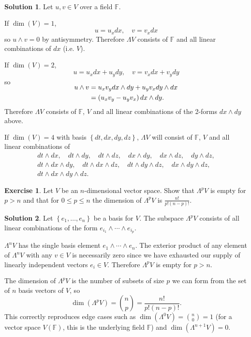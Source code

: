 \documentclass[11pt, a4paper]{article}
\theoremstyle{definition}
\newtheorem{ex}{Exercise}[part]
\newtheorem{sol}{Solution}[part]
\begin{document}
\begin{sol}

Let $u, v \in V$ over a field $\mathbb{F}$.

If $\dim(V) = 1$,
\[
    u = u_x dx, \quad v = v_x dx
\]
so $u \wedge v = 0$ by antisymmetry. Therefore $\Lambda V$ consists of $\mathbb{F}$ and all linear combinations of $dx$ (i.e. $V$).

If $\dim(V) = 2$,
\[
    u = u_x dx + u_y dy, \quad v = v_x dx + v_y dy
\]
so
\begin{align*}
    \SwapAboveDisplaySkip
    u \wedge v &= u_x v_y dx \wedge dy + u_y v_x dy \wedge dx \\
               &= (u_x v_y - u_y v_x) \, dx \wedge dy.
\end{align*}
Therefore $\Lambda V$ consists of $\mathbb{F}$, $V$ and all linear combinations of the 2-forms $dx \wedge dy$ above.

If $\dim(V) = 4$ with basis $\left\{dt, dx, dy, dz\right\}$, $\Lambda V$ will consist of $\mathbb{F}$, $V$ and all linear combinations of
\begin{gather*}
    dt \wedge dx, \quad
    dt \wedge dy, \quad
    dt \wedge dz, \quad
    dx \wedge dy, \quad
    dx \wedge dz, \quad
    dy \wedge dz, \\
    dt \wedge dx \wedge dy, \quad
    dt \wedge dx \wedge dz, \quad
    dt \wedge dy \wedge dz, \quad
    dx \wedge dy \wedge dz, \\
    dt \wedge dx \wedge dy \wedge dz.
\end{gather*}

\end{sol}

\begin{ex}

Let $V$ be an $n$-dimensional vector space. Show that $\Lambda^p V$ is empty for $p > n$ and that for $0 \leq p \leq n$ the dimension of $\Lambda^p V$ is $\frac{n!}{p! (n - p)!}$.

\end{ex}

\begin{sol}

Let $\left\{e_1, \ldots, e_n\right\}$ be a basis for $V$.
The subspace $\Lambda^p V$ consists of all linear combinations of the form $e_{i_1} \wedge \cdots \wedge e_{i_p}$.

$\Lambda^n V$ has the single basis element $e_1 \wedge \cdots \wedge e_n$.
The exterior product of any element of $\Lambda^n V$ with any $v \in V$ is necessarily zero since we have exhausted our supply of linearly independent vectors $e_i \in V$. Therefore $\Lambda^p V$ is empty for $p > n$.

The dimension of $\Lambda^p V$ is the number of subsets of size $p$ we can form from the set of $n$ basis vectors of $V$, so
\[
    \dim(\Lambda^p V) = \binom{n}{p} = \frac{n!}{p! (n - p)!}.
\]
This correctly reproduces edge cases such as $\dim(\Lambda^0 V) = \binom{n}{0} = 1$ (for a vector space $V(\mathbb{F})$, this is the underlying field $\mathbb{F}$) and $\dim(\Lambda^{n+1}V) = 0$.

\end{sol}
\end{document}
